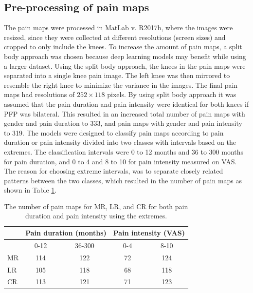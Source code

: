 \subsection{Pre-processing of pain maps}
The pain maps were processed in MatLab v. R2017b, where the images were resized, since they were collected at different resolutions (screen sizes) and cropped to only include the knees. To increase the amount of pain maps, a split body approach was chosen because deep learning models may benefit while using a larger dataset. Using the split body approach, the knees in the pain maps were separated into a single knee pain image. The left knee was then mirrored to resemble the right knee to minimize the variance in the images. The final pain maps had resolutions of $252 \times 118$ pixels.
By using split body approach it was assumed that the pain duration and pain intensity were identical for both knees if PFP was bilateral. This resulted in an increased total number of pain maps with gender and pain duration to 333, and pain maps with gender and pain intensity to 319. \newline
\noindent
The models were designed to classify pain maps according to pain duration or pain intensity divided into two classes with intervals based on the extremes. The classification intervals were 0 to 12 months and 36 to 300 months for pain duration, and 0 to 4 and 8 to 10 for pain intensity measured on VAS. The reason for choosing extreme intervals, was to separate closely related patterns between the two classes, which resulted in the number of pain maps as shown in Table \ref{tab:painmaps}.

\begin{table}[H]
\centering
\begin{tabular}{@{}lcccc@{}}
\toprule
   & \multicolumn{2}{c}{Pain duration (months)} & \multicolumn{2}{c}{Pain intensity (VAS)} \\ \midrule
   & 0-12                & 36-300               & 0-4                & 8-10                \\ \midrule
MR & 114                 & 122                  & 72                 & 124                 \\
LR & 105                 & 118                  & 68                 & 118                 \\
CR & 113                 & 121                  & 71                 & 123                 \\ \bottomrule
\end{tabular}
\caption{The number of pain maps for MR, LR, and CR for both pain duration and pain intensity using the extremes.}
\label{tab:painmaps}
\end{table}

